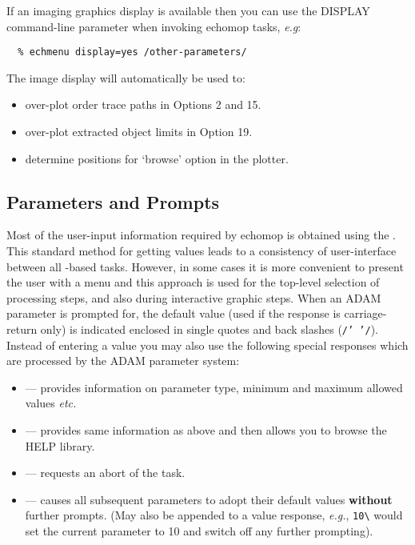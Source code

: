 If an imaging graphics display is available then you can use the
DISPLAY command-line parameter when invoking {\sc echomop} tasks, {\em e.g}:

\begin{verbatim}
  % echmenu display=yes /other-parameters/
\end{verbatim}

The image display will automatically be used to:

\begin{itemize}
\item {over-plot order trace paths in Options 2 and 15.}
\item {over-plot extracted object limits in Option 19.}
\item {determine positions for `browse' option in the plotter.}
\end{itemize}


\subsection{Parameters and Prompts}

Most of the user-input information required by {\sc echomop} is obtained
using the .
This standard method for getting values leads to a consistency of
user-interface between all -based tasks.
However, in some cases it is more convenient to present the user with a menu
and this approach is used for the top-level selection of processing steps,
and also during interactive graphic steps.
When an ADAM parameter is prompted for, the default value (used if the
response is carriage-return only) is indicated enclosed in single quotes and
back slashes ({\tt /' '/}).
Instead of entering a value you may also use the following special
responses which are processed by the ADAM parameter system:

\begin{itemize}

\item [\verb+?+] --- provides information on parameter type, minimum and
      maximum allowed values {\it etc.}

\item [\verb+??+] ---  provides same information as above and then allows
      you to browse the HELP library.

\item [\verb+!!+] --- 
      requests an abort of the task.

\item [\sunspec{$\backslash$}{\verb+\+}] ---
       causes all
      subsequent parameters to adopt their default values {\bf without}
      further prompts. (May also be appended to a value response, {\it
      {e.g.}}, \verb+10\+ would set the current parameter to 10 and
      switch off any further prompting).

\end{itemize}

